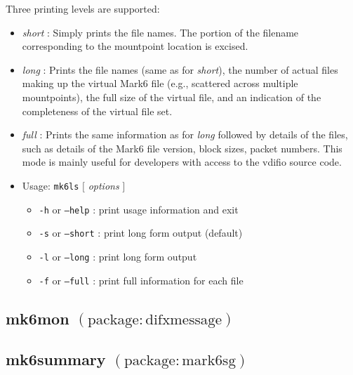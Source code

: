 Three printing levels are supported:
\begin{itemize}
\item {\em short} : Simply prints the file names.  The portion of the filename corresponding to the mountpoint location is excised.
\item {\em long} : Prints the file names (same as for {\em short}), the number of actual files making up the virtual Mark6 file (e.g., scattered across multiple mountpoints), the full size of the virtual file, and an indication of the completeness of the virtual file set.
\item {\em full} : Prints the same information as for {\em long} followed by details of the files, such as details of the Mark6 file version, block sizes, packet numbers.  This mode is mainly useful for developers with access to the vdifio source code.
\end{itemize}

\begin{itemize}
\item[] Usage: {\tt mk6ls} $[$ {\em options} $]$
\begin{itemize}
\item[] {\tt -h} or {\tt --help} : print usage information and exit
\item[] {\tt -s} or {\tt --short} : print long form output (default)
\item[] {\tt -l} or {\tt --long} : print long form output
\item[] {\tt -f} or {\tt --full} : print full information for each file
\end{itemize}
\end{itemize}




\subsection{mk6mon {\small $\mathrm{(package: difxmessage)}$}} \label{sec:mk6mon} 




\subsection{mk6summary {\small $\mathrm{(package: mark6sg)}$}} \label{sec:mk6summary} 


